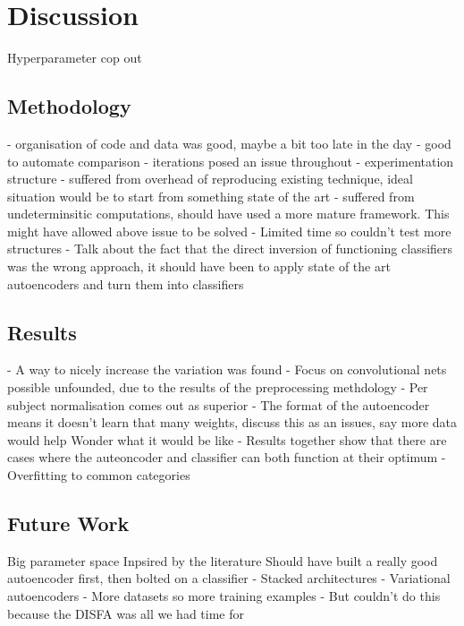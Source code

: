 \chapter{Discussion}
  Hyperparameter cop out
  \section{Methodology}
    - organisation of code and data was good, maybe a bit too late in the day
      - good to automate comparison
    - iterations posed an issue throughout
    - experimentation structure
    - suffered from overhead of reproducing existing technique, ideal situation would be to start from something state of the art
    - suffered from undeterminsitic computations, should have used a more mature framework. This might have allowed
      above issue to be solved
    - Limited time so couldn't test more structures
    - Talk about the fact that the direct inversion of functioning classifiers was the wrong approach,
      it should have been to apply state of the art autoencoders and turn them into classifiers
  \section{Results}
    - A way to nicely increase the variation was found
    - Focus on convolutional nets possible unfounded, due to the results of the preprocessing methdology
    - Per subject normalisation comes out as superior
    - The format of the autoencoder means it doesn't learn that many weights, discuss this as an issues, say more data would help
      Wonder what it would be like
    - Results together show that there are cases where the auteoncoder and classifier can both function at their optimum
    - Overfitting to common categories


  \section{Future Work}
    Big parameter space
    Inpsired by the literature
    Should have built a really good autoencoder first, then bolted on a classifier
      - Stacked architectures
      - Variational autoencoders
      - More datasets so more training examples
        - But couldn't do this because the DISFA was all we had time for

